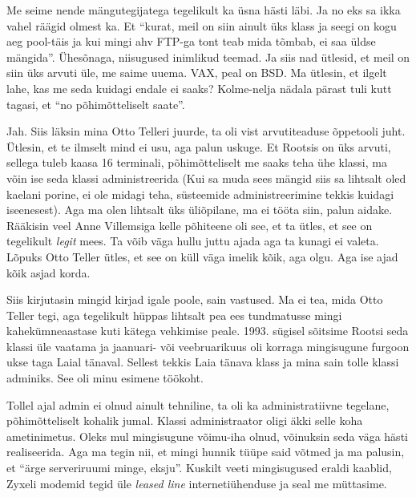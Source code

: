 Me seime nende mängutegijatega tegelikult ka üsna hästi läbi. Ja no eks sa ikka 
vahel räägid olmest ka. Et \enquote{kurat, meil on siin ainult üks klass ja 
seegi  on kogu aeg pool-täis ja kui mingi ahv FTP-ga tont teab mida tõmbab, ei 
saa üldse mängida}. Ühesõnaga, niisugused inimlikud teemad. Ja siis nad ütlesid, 
et meil on siin üks arvuti üle, me saime uuema. VAX, peal on 
BSD. Ma ütlesin, et ilgelt lahe, kas me seda kuidagi endale ei 
saaks? Kolme-nelja nädala pärast tuli kutt tagasi, et \enquote{no 
põhimõtteliselt saate}. 


Jah. Siis läksin mina Otto Telleri juurde, ta oli vist 
arvutiteaduse õppetooli juht. Ütlesin, et te ilmselt mind ei usu, aga palun 
uskuge. Et Rootsis on üks arvuti, sellega tuleb kaasa 16 terminali, 
põhimõtteliselt me saaks teha ühe klassi, ma võin ise seda klassi 
administreerida (Kui sa muda sees mängid siis sa lihtsalt oled kaelani porine, 
ei ole midagi teha, süsteemide administreerimine tekkis  kuidagi iseenesest). 
Aga ma olen lihtsalt üks üliõpilane, ma ei tööta siin, palun aidake. Rääkisin 
veel Anne Villemsiga kelle põhiteene oli 
see, et ta ütles, et see on tegelikult \emph{legit} mees. Ta võib väga hullu 
juttu ajada aga ta kunagi ei valeta. Lõpuks Otto Teller ütles, et see on küll 
väga imelik kõik, aga olgu. Aga ise ajad kõik asjad korda.

Siis kirjutasin mingid kirjad igale poole, sain vastused. Ma ei tea, mida Otto 
Teller tegi, aga tegelikult hüppas lihtsalt pea ees tundmatusse mingi kahekümneaastase 
kuti kätega vehkimise peale. 1993. sügisel sõitsime Rootsi seda klassi 
üle vaatama ja  jaanuari- või veebruarikuus oli korraga mingisugune furgoon 
ukse taga Laial tänaval. Sellest tekkis Laia tänava klass ja mina sain tolle klassi adminiks. See oli minu 
esimene töökoht.

Tollel ajal admin ei olnud ainult  tehniline,  ta oli ka  
administratiivne tegelane, põhimõtteliselt kohalik jumal. Klassi administraator 
oligi äkki selle koha ametinimetus. Oleks mul mingisugune võimu-iha olnud, 
võinuksin seda väga hästi realiseerida. Aga ma tegin nii, et mingi hunnik tüüpe 
said võtmed ja ma palusin, et \enquote{ärge serveriruumi minge, eksju}. Kuskilt 
veeti mingisugused eraldi kaablid, Zyxeli modemid tegid üle \emph{leased line} 
internetiühenduse  ja seal me müttasime.

